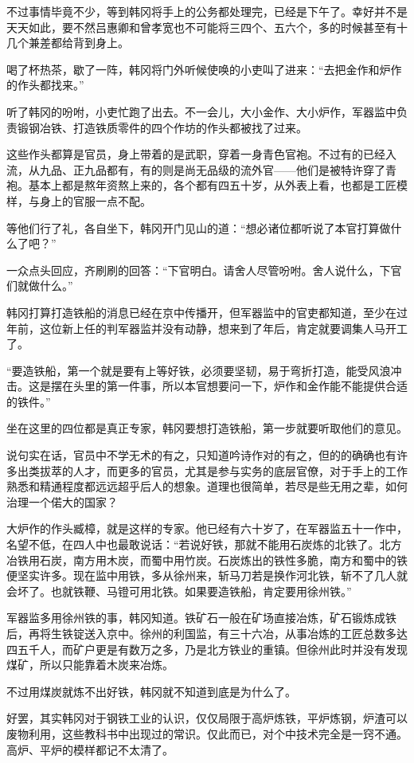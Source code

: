 不过事情毕竟不少，等到韩冈将手上的公务都处理完，已经是下午了。幸好并不是天天如此，要不然吕惠卿和曾孝宽也不可能将三四个、五六个，多的时候甚至有十几个兼差都给背到身上。

喝了杯热茶，歇了一阵，韩冈将门外听候使唤的小吏叫了进来：“去把金作和炉作的作头都找来。”

听了韩冈的吩咐，小吏忙跑了出去。不一会儿，大小金作、大小炉作，军器监中负责锻钢冶铁、打造铁质零件的四个作坊的作头都被找了过来。

这些作头都算是官员，身上带着的是武职，穿着一身青色官袍。不过有的已经入流，从九品、正九品都有，有的则是尚无品级的流外官——他们是被特许穿了青袍。基本上都是熬年资熬上来的，各个都有四五十岁，从外表上看，也都是工匠模样，与身上的官服一点不配。

等他们行了礼，各自坐下，韩冈开门见山的道：“想必诸位都听说了本官打算做什么了吧？”

一众点头回应，齐刷刷的回答：“下官明白。请舍人尽管吩咐。舍人说什么，下官们就做什么。”

韩冈打算打造铁船的消息已经在京中传播开，但军器监中的官吏都知道，至少在过年前，这位新上任的判军器监并没有动静，想来到了年后，肯定就要调集人马开工了。

“要造铁船，第一个就是要有上等好铁，必须要坚韧，易于弯折打造，能受风浪冲击。这是摆在头里的第一件事，所以本官想要问一下，炉作和金作能不能提供合适的铁件。”

坐在这里的四位都是真正专家，韩冈要想打造铁船，第一步就要听取他们的意见。

说句实在话，官员中不学无术的有之，只知道吟诗作对的有之，但的的确确也有许多出类拔萃的人才，而更多的官员，尤其是参与实务的底层官僚，对于手上的工作熟悉和精通程度都远远超乎后人的想象。道理也很简单，若尽是些无用之辈，如何治理一个偌大的国家？

大炉作的作头臧樟，就是这样的专家。他已经有六十岁了，在军器监五十一作中，名望不低，在四人中也最敢说话：“若说好铁，那就不能用石炭炼的北铁了。北方冶铁用石炭，南方用木炭，而蜀中用竹炭。石炭炼出的铁性多脆，南方和蜀中的铁便坚实许多。现在监中用铁，多从徐州来，斩马刀若是换作河北铁，斩不了几人就会坏了。也就铁鞭、马镫可用北铁。如果要造铁船，肯定要用徐州铁。”

军器监多用徐州铁的事，韩冈知道。铁矿石一般在矿场直接冶炼，矿石锻炼成铁后，再将生铁锭送入京中。徐州的利国监，有三十六冶，从事冶炼的工匠总数多达四五千人，而矿户更是有数万之多，乃是北方铁业的重镇。但徐州此时并没有发现煤矿，所以只能靠着木炭来冶炼。

不过用煤炭就炼不出好铁，韩冈就不知道到底是为什么了。

好罢，其实韩冈对于钢铁工业的认识，仅仅局限于高炉炼铁，平炉炼钢，炉渣可以废物利用，这些教科书中出现过的常识。仅此而已，对个中技术完全是一窍不通。高炉、平炉的模样都记不太清了。

